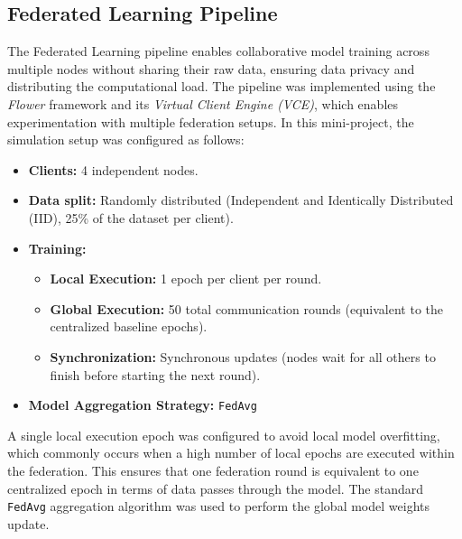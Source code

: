\subsection{Federated Learning Pipeline}
\label{sec:fl_architecture}

The Federated Learning pipeline enables collaborative model training
across multiple nodes without sharing their raw data, 
ensuring data privacy and distributing the computational
load. The pipeline was implemented using the \textit{Flower} framework
\cite{Beuteletal2020} and its \textit{Virtual Client Engine (VCE)},
which enables experimentation with multiple federation setups. In this
mini-project, the simulation setup was configured as follows:

\begin{itemize}
\item \textbf{Clients:} 4 independent nodes.
\item \textbf{Data split:} Randomly distributed (Independent and Identically
  Distributed (IID), 25\% of the dataset per client).
\item \textbf{Training:}
  \begin{itemize}
  \item \textbf{Local Execution:} 1 epoch per client per round.
  \item \textbf{Global Execution:} 50 total communication rounds
    (equivalent to the centralized baseline epochs).
  \item \textbf{Synchronization:} Synchronous updates (nodes wait for
    all others to finish before starting the next round).
  \end{itemize}

 \item \textbf{Model Aggregation Strategy:} \texttt{FedAvg}
\end{itemize}

A single local execution epoch was configured to avoid local model
overfitting, which commonly occurs when a high number of local epochs are
executed within the federation. This ensures that one federation round is
equivalent to one centralized epoch in terms of data passes through
the model. The standard \texttt{FedAvg} aggregation algorithm was used
to perform the global model weights update.